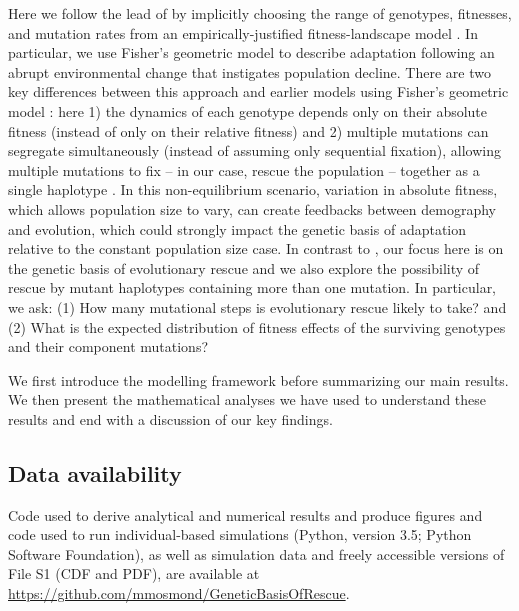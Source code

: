 \documentclass[9pt,twocolumn,twoside,lineno]{gsajnl}
\begin{document}
Here we follow the lead of \cite{Anciaux2018} by implicitly choosing the range of genotypes, fitnesses, and mutation rates from an empirically-justified fitness-landscape model \citep{Tenaillon2014}.
In particular, we use Fisher's geometric model to describe adaptation following an abrupt environmental change that instigates population decline.
There are two key differences between this approach and earlier models using Fisher's geometric model \citep[e.g.,][]{Orr1998}:
here
1) the dynamics of each genotype depends only on their absolute fitness (instead of only on their relative fitness) and
2) multiple mutations can segregate simultaneously (instead of assuming only sequential fixation), allowing multiple mutations to fix -- in our case, rescue the population -- together as a single haplotype \citep[i.e., stochastic tunnelling,][]{iwasa2004stochastic}.
In this non-equilibrium scenario, variation in absolute fitness, which allows population size to vary, can create feedbacks between demography and evolution, which could strongly impact the genetic basis of adaptation relative to the constant population size case.
In contrast to \cite{Anciaux2018}, our focus here is on the genetic basis of evolutionary rescue and we also explore the possibility of rescue by mutant haplotypes containing more than one mutation.
In particular, we ask: (1) How many mutational steps is evolutionary rescue likely to take? and (2) What is the expected distribution of fitness effects of the surviving genotypes and their component mutations?

We first introduce the modelling framework before summarizing our main results.
We then present the mathematical analyses we have used to understand these results and end with a discussion of our key findings.

\subsection{Data availability}

Code used to derive analytical and numerical results and produce figures \citep[referred to here as File S1; Mathematica, version 9.0;][]{Mathematica} and
code used to run individual-based simulations (Python, version 3.5; Python Software Foundation), as well as
simulation data and freely accessible versions of File S1 (CDF and PDF), 
are available at \url{https://github.com/mmosmond/GeneticBasisOfRescue}.
\end{document}
